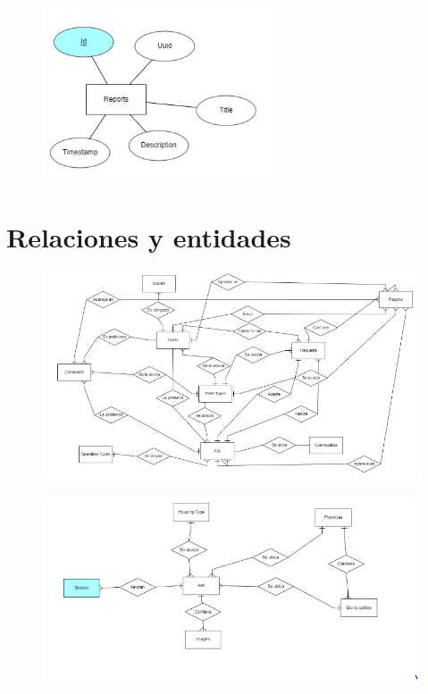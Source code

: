 \begin{figure}[h!]
\centering
\includegraphics[width=.4\textwidth]{Img/Disenyo/ER/upohouse_er_attr_4.PNG}
\label{fig:dcu}
\end{figure}



\section{Relaciones y entidades}
\begin{figure}[h!]
\centering
\includegraphics[width=1\textwidth]{Img/Disenyo/ER/upohouse_er_rel_1.PNG}
\label{fig:dcu}
\end{figure}

\begin{figure}[h!]
\centering
\includegraphics[width=1\textwidth]{Img/Disenyo/ER/upohouse_er_rel_2.PNG}
\label{fig:dcu}
\end{figure}